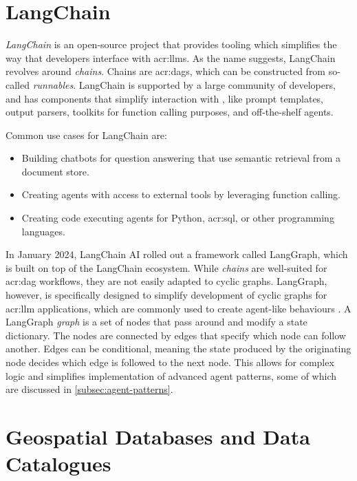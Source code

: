 \section{LangChain}
\label{sec:langchain}

\textit{LangChain} \citep{langchainaiLangchainaiLangchain2022} is an open-source project that provides tooling which simplifies the way that developers interface with \glspl{acr:llm}. As the name suggests, LangChain revolves around \textit{chains}. Chains are \glspl{acr:dag}, which can be constructed from so-called \textit{runnables}. LangChain is supported by a large community of developers, and has components that simplify interaction with , like prompt templates, output parsers, toolkits for function calling purposes, and off-the-shelf agents.

Common use cases for LangChain are:

\begin{itemize}
    \item Building chatbots for question answering that use semantic retrieval from a document store.
    \item Creating agents with access to external tools by leveraging function calling.
    \item Creating code executing agents for Python, \acrshort{acr:sql}, or other programming languages.
\end{itemize}

In January 2024, LangChain AI rolled out a framework called LangGraph, which is built on top of the LangChain ecosystem. While \textit{chains} are well-suited for \gls{acr:dag} workflows, they are not easily adapted to cyclic graphs. LangGraph, however, is specifically designed to simplify development of cyclic graphs for \acrshort{acr:llm} applications, which are commonly used to create agent-like behaviours \citep{langchainaiLangchainaiLanggraph2024}. A LangGraph \textit{graph} is a set of nodes that pass around and modify a state dictionary. The nodes are connected by edges that specify which node can follow another. Edges can be conditional, meaning the state produced by the originating node decides which edge is followed to the next node. This allows for complex logic and simplifies implementation of advanced agent patterns, some of which are discussed in \autoref{subsec:agent-patterns}.


\section{Geospatial Databases and Data Catalogues}
\label{sec:geo-dbs-and-data-catalogues}

